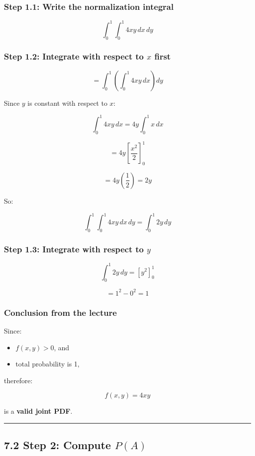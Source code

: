 \documentclass[12pt]{article}
\begin{document}
\subsubsection*{Step 1.1: Write the normalization integral}

\[
\int_0^1 \int_0^1 4xy\,dx\,dy
\]

\subsubsection*{Step 1.2: Integrate with respect to \(x\) first}

\[
= \int_0^1 \left( \int_0^1 4xy\,dx \right) dy
\]

Since \(y\) is constant with respect to \(x\):

\[
\int_0^1 4xy\,dx = 4y\int_0^1 x\,dx
\]

\[
= 4y\left[\frac{x^2}{2}\right]_0^1
\]

\[
= 4y\left(\frac{1}{2}\right)=2y
\]

So:

\[
\int_0^1 \int_0^1 4xy\,dx\,dy = \int_0^1 2y\,dy
\]

\subsubsection*{Step 1.3: Integrate with respect to \(y\)}

\[
\int_0^1 2y\,dy = [y^2]_0^1
\]

\[
=1^2-0^2=1
\]

\subsubsection*{Conclusion from the lecture}

Since:

\begin{itemize}
    \item \(f(x,y)>0\), and
    \item total probability is 1,
\end{itemize}

therefore:

\[
f(x,y)=4xy
\]

is a \textbf{valid joint PDF}.

\hrule
\vspace{1em}

\subsection*{7.2 Step 2: Compute \(P(A)\)}
\end{document}
